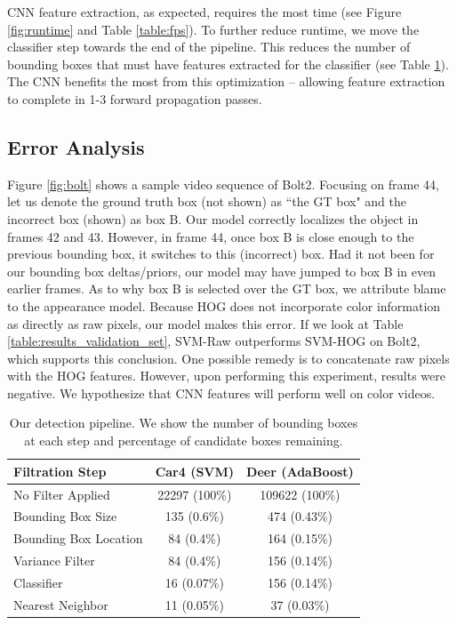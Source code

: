 \documentclass[10pt,twocolumn,letterpaper]{article}
\begin{document}
CNN feature extraction, as expected, requires the most time (see Figure \ref{fig:runtime} and Table \ref{table:fps}). To further reduce runtime, we move the classifier step towards the end of the pipeline. This reduces the number of bounding boxes that must have features extracted for the classifier (see Table \ref{table:pipeline}). The CNN benefits the most from this optimization -- allowing feature extraction to complete in 1-3 forward propagation passes.

\subsection{Error Analysis}

Figure \ref{fig:bolt} shows a sample video sequence of Bolt2. Focusing on frame 44, let us denote the ground truth box (not shown) as ``the GT box" and the incorrect box (shown) as box B. Our model correctly localizes the object in frames 42 and 43. However, in frame 44, once box B is close enough to the previous bounding box, it switches to this (incorrect) box. Had it not been for our bounding box deltas/priors, our model may have jumped to box B in even earlier frames. As to why box B is selected over the GT box, we attribute blame to the appearance model. Because HOG does not incorporate color information as directly as raw pixels, our model makes this error. If we look at Table \ref{table:results_validation_set}, SVM-Raw outperforms SVM-HOG on Bolt2, which supports this conclusion. One possible remedy is to concatenate raw pixels with the HOG features. However, upon performing this experiment, results were negative. We hypothesize that CNN features will perform well on color videos.



\begin{table}[t]
\caption{Our detection pipeline. We show the number of bounding boxes at each step and percentage of candidate boxes remaining.}
	\small
	\begin{tabular}{|l|c|c|}
		\hline
		Filtration Step & Car4 (SVM) & Deer (AdaBoost) \\ \hline
		No Filter Applied & 22297 (100\%) & 109622 (100\%) \\ 
		Bounding Box Size & 135 (0.6\%) & 474 (0.43\%) \\
		Bounding Box Location & 84 (0.4\%) & 164 (0.15\%) \\ 
		Variance Filter & 84 (0.4\%) & 156 (0.14\%) \\
		Classifier & 16 (0.07\%) & 156 (0.14\%) \\ 
		Nearest Neighbor & 11 (0.05\%) & 37 (0.03\%) \\ \hline
	\end{tabular}
	\vspace{-4mm}
	\label{table:pipeline}
\end{table}
\end{document}
